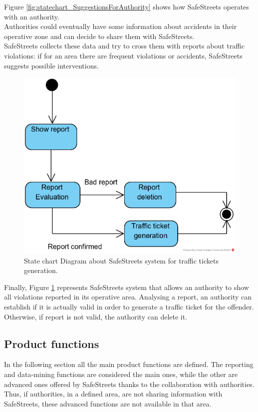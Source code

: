 \documentclass{article}
\begin{document}
			Figure \ref{fig:statechart_SuggestionsForAuthority} shows how SafeStreets operates with an authority.\\
			Authorities could eventually have some information about accidents in their operative zone and can decide to share them with SafeStreets.\\
			SafeStreets collects these data and try to cross them with reports about traffic violations: if for an area there are frequent violations or accidents, SafeStreets suggests possible interventions.
			
			\clearpage
			
			\begin{figure}[H]
				\centering
				\includegraphics {diagrams/statechart_trafficTicket.png}
				\caption[Statechart Diagram3]{State chart Diagram about SafeStreets system for traffic tickets generation.}
				\label{fig:statechart_trafficTickets}
			\end{figure}
			
			Finally, Figure \ref{fig:statechart_trafficTickets} represents SafeStreets system that allows an authority to show all violations reported in its operative area. Analysing a report, an authority can establish if it is actually valid in order to generate a traffic ticket for the offender. Otherwise, if report is not valid, the authority can delete it.
			
			\clearpage	   
	
		\subsection{Product functions}
			In the following section all the main product functions are defined. The reporting and data-mining functions are considered the main ones, while the other are advanced ones offered by SafeStreets thanks to the collaboration with authorities. Thus, if authorities, in a defined area, are not sharing information with SafeStreets, these advanced functions are not available in that area.
			
\end{document}
